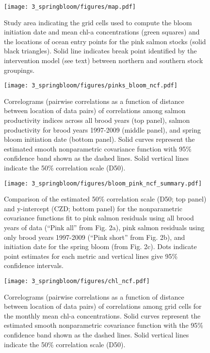 \begin{figure}[htbp]
  \centering \texttt{[image: 3\_springbloom/figures/map.pdf]}
  \caption{Study area indicating the grid cells used to compute the bloom
    initiation date and mean chl-a concentrations (green squares) and the
    locations of ocean entry points for the pink salmon stocks (solid black
    triangles). Solid line indicates break point identified by the intervention
    model (see text) between northern and southern stock groupings.}
  \label{fig:bloom:1}
\end{figure}

\begin{figure}[htbp]
  \centering \texttt{[image: 3\_springbloom/figures/pinks\_bloom\_ncf.pdf]}
  \caption{Correlograms (pairwise correlations as a function of distance between
    location of data pairs) of correlations among salmon productivity indices
    across all brood years (top panel), salmon productivity for brood years
    1997-2009 (middle panel), and spring bloom initiation date (bottom panel).
    Solid curves represent the estimated smooth nonparametric covariance
    function with 95\% confidence band shown as the dashed lines. Solid vertical
    lines indicate the 50\% correlation scale (D50).}
  \label{fig:bloom:2}
\end{figure}

\begin{figure}[htbp]
  \centering \texttt{[image: 3\_springbloom/figures/bloom\_pink\_ncf\_summary.pdf]}
  \caption{Comparison of the estimated 50\% correlation scale (D50; top panel)
    and y-intercept (CZD; bottom panel) for the nonparametric covariance
    functions fit to pink salmon residuals using all brood years of data (``Pink
    all'' from Fig. 2a), pink salmon residuals using only brood years 1997-2009
    (``Pink short'' from Fig.  2b), and initiation date for the spring bloom
    (from Fig. 2c). Dots indicate point estimates for each metric and vertical
    lines give 95\% confidence intervals.}
  \label{fig:bloom:3}
\end{figure}

\begin{figure}[htbp]
  \centering \texttt{[image: 3\_springbloom/figures/chl\_ncf.pdf]}
  \caption{Correlograms (pairwise correlations as a function of distance between
    location of data pairs) of correlations among grid cells for the monthly
    mean chl-a concentrations. Solid curves represent the estimated smooth
    nonparametric covariance function with the 95\% confidence band shown as the
    dashed lines. Solid vertical lines indicate the 50\% correlation scale
    (D50).}
  \label{fig:bloom:4}
\end{figure}

